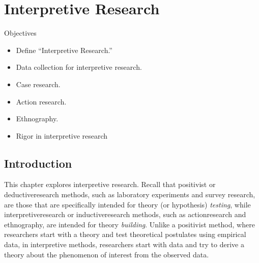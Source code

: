\chapter{Interpretive Research}\label{ch13:interpretive_research}

\begin{center}
	\begin{objbox}{Objectives}
		\begin{itemize}
			\setlength{\itemsep}{0pt}
			\setlength{\parskip}{0pt}
			\setlength{\parsep}{0pt}
			
			\item Define ``Interpretive Research.''
			\item Data collection for interpretive research.
			\item Case research.
			\item Action research.
			\item Ethnography.
			\item Rigor in interpretive research
		\end{itemize}
	\end{objbox}
\end{center}

\section{Introduction}

This chapter explores interpretive research. Recall that \gls{positivist} or \gls{deductiveresearch} methods, such as laboratory experiments and survey research, are those that are specifically intended for \gls{theory} (or \gls{hypothesis}) \textit{testing}, while \gls{interpretiveresearch} or \gls{inductiveresearch} methods, such as \gls{actionresearch} and \gls{ethnography}, are intended for theory \textit{building}. Unlike a positivist method, where researchers start with a theory and test theoretical postulates using empirical data, in interpretive methods, researchers start with data and try to derive a theory about the phenomenon of interest from the observed data.

